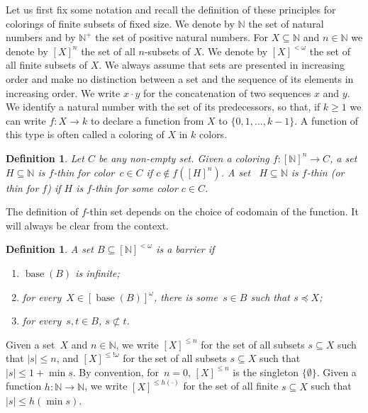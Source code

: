 \documentclass[10pt,a4paper]{article}
\newcommand{\NN}[0]{\mathbb{N}}
\newcommand{\base}{\operatorname{base}}
\numberwithin{theorem}{section}
\newtheorem{definition}[theorem]{Definition}
\begin{document}
Let us first fix some notation and recall the definition of these principles for colorings of finite subsets of fixed size. We denote by $\NN$ the set of natural numbers and by $\NN^+$ the set of positive natural numbers. For $X\subseteq \NN$ and $n \in \NN$
we denote by $[X]^{n}$ the set of all $n$-subsets of $X$. We denote by $[X]^{<\omega}$ the set of all finite subsets of $X$. We always assume that sets are presented in increasing order and make no distinction between a set and the sequence of its elements in increasing order. We write $x \cdot y$ for the concatenation of two sequences $x$ and $y$. We identify a natural number with the set of its predecessors, so that, if $k\geq 1$ we can write $f: X \to k$ to declare a function from $X$ to $\{0, 1, \dots, k-1\}$. A function of this type is often called a coloring of $X$ in $k$ colors.

\begin{definition}
Let $C$ be any non-empty set. Given a coloring $f : [\NN]^n \to C$, a set~$H \subseteq \NN$ is \emph{$f$-thin for color~$c \in C$} if $c \not \in f([H]^n)$. A set ~$H \subseteq \NN$ is $f$-thin (or thin for $f$) if $H$ is $f$-thin for some color $c\in C$.
\end{definition}

The definition of $f$-thin set depends on the choice of codomain of the function. It will always be clear from the context. 

\begin{definition}
A set $B \subseteq [\NN]^{<\omega}$ is a \emph{barrier} if
\begin{enumerate}
    \item[(1)] $\base(B)$ is infinite;
    \item[(2)] for every~$X \in [\base(B)]^\omega$, there is some~$s \in B$ such that $s \preceq X$;
    \item[(3)] for every~$s, t \in B$, $s \not \subset t$.
\end{enumerate}
\end{definition}

Given a set~$X$ and $n \in \NN$, we write $[X]^{\leq n}$ for the set of all subsets $s \subseteq X$ such that $|s| \leq n$, and $[X]^{\leq !\omega}$ for the set of all subsets $s \subseteq X$ such that $|s| \leq 1+\min s$. By convention, for~$n = 0$, $[X]^{\leq n}$ is the singleton $\{\emptyset\}$. Given a function $h : \NN \to \NN$, we write $[X]^{\leq h(\cdot)}$ for the set of all finite $s \subseteq X$ such that $|s| \leq h(\min s)$. %
\end{document}
